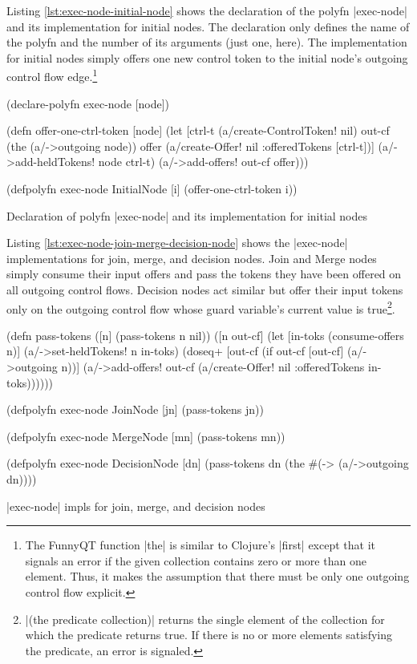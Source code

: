 \documentclass[submission]{eptcs}
\newcommand{\code}{\clojureinline}
\begin{document}
Listing \vref{lst:exec-node-initial-node} shows the declaration of the polyfn
\code|exec-node| and its implementation for initial nodes.  The declaration
only defines the name of the polyfn and the number of its arguments (just one,
here).  The implementation for initial nodes simply offers one new control
token to the initial node's outgoing control flow edge.\footnote{The FunnyQT
  function \code|the| is similar to Clojure's \code|first| except that it
  signals an error if the given collection contains zero or more than one
  element.  Thus, it makes the assumption that there must be only one outgoing
  control flow explicit.}

\begin{listing}[h!tb]
\begin{clojurecode}
(declare-polyfn exec-node [node])

(defn offer-one-ctrl-token [node]
  (let [ctrl-t (a/create-ControlToken! nil)
        out-cf (the (a/->outgoing node))
        offer  (a/create-Offer! nil {:offeredTokens [ctrl-t]})]
    (a/->add-heldTokens! node ctrl-t)
    (a/->add-offers! out-cf offer)))

(defpolyfn exec-node InitialNode [i]
  (offer-one-ctrl-token i))
\end{clojurecode}
\caption{Declaration of polyfn \code|exec-node| and its implementation for initial nodes}
\label{lst:exec-node-initial-node}
\end{listing}

Listing \vref{lst:exec-node-join-merge-decision-node} shows the
\code|exec-node| implementations for join, merge, and decision nodes.  Join and
Merge nodes simply consume their input offers and pass the tokens they have
been offered on all outgoing control flows.  Decision nodes act similar but
offer their input tokens only on the outgoing control flow whose guard
variable's current value is true\footnote{\code|(the predicate collection)|
  returns the single element of the collection for which the predicate returns
  true.  If there is no or more elements satisfying the predicate, an error is
  signaled.}.

\begin{listing}[h!tb]
\begin{clojurecode}
(defn pass-tokens
  ([n] (pass-tokens n nil))
  ([n out-cf]
   (let [in-toks (consume-offers n)]
     (a/->set-heldTokens! n in-toks)
     (doseq+ [out-cf (if out-cf [out-cf] (a/->outgoing n))]
       (a/->add-offers!
        out-cf (a/create-Offer!
                nil {:offeredTokens in-toks}))))))

(defpolyfn exec-node JoinNode [jn]
  (pass-tokens jn))

(defpolyfn exec-node MergeNode [mn]
  (pass-tokens mn))

(defpolyfn exec-node DecisionNode [dn]
  (pass-tokens dn (the #(-> %
                       (a/->outgoing dn))))
\end{clojurecode}
\caption{\code|exec-node| impls for join, merge, and decision nodes}
\label{lst:exec-node-join-merge-decision-node}
\end{listing}
\end{document}
